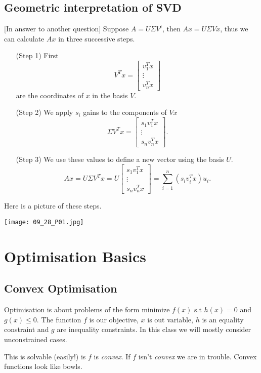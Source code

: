 \subsection{Geometric interpretation of SVD}
[In answer to another question] Suppose $A = U\Sigma V^t$, then $Ax = U\Sigma Vx$, thus we can calculate $Ax$ in three successive steps.
\begin{enumerate}
    \item[(Step 1)] First 
    \[V^Tx = \begin{bmatrix}
        v_1^Tx\\
        \vdots\\
        v_n^Tx
    \end{bmatrix} \]
    are the coordinates of $x$ in the basis $V$.
    \item[(Step 2)] We apply $s_i$ gains to the components of $Vx$
    \[\Sigma V^Tx = \begin{bmatrix}
        s_1v_1^Tx\\
        \vdots\\
        s_nv_n^Tx
    \end{bmatrix}.  \]   
    \item[(Step 3)] We use these values to define a new vector using the basis $U$.
    \[Ax = U\Sigma V^Tx = U\begin{bmatrix}
        s_1v_1^Tx\\
        \vdots\\
        s_nv_n^Tx
    \end{bmatrix} = \sum_{i=1}^n (s_iv_i^Tx)u_i.  \]  
\end{enumerate}
Here is a picture of these steps.

\texttt{[image: 09\_28\_P01.jpg]}
\section{Optimisation Basics}
\subsection{Convex Optimisation}
Optimisation is about problems of the form minimize $f(x)$ s.t $h(x) = 0$ and $g(x) \le 0$. The function $f$ is our objective, $x$ is out variable, $h$ is an equality constraint and $g$ are inequality constraints. In this class we will mostly consider unconstrained cases.

This is solvable (easily!) is $f$ is \emph{convex}. If $f$ isn't \emph{convex} we are in trouble. Convex functions look like bowls.

